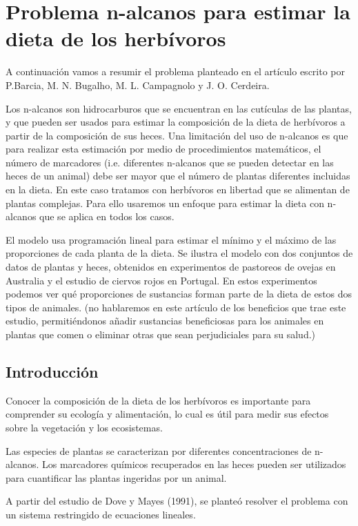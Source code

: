 \documentclass[11pt]{article}
\begin{document}
\section*{ \textbf{Problema n-alcanos para estimar la dieta de los herbívoros} } %
A continuación vamos a resumir el problema planteado en el artículo \cite{n-alkanes_problem} escrito por P.Barcia, M. N. Bugalho, M. L. Campagnolo y J. O. Cerdeira. 

Los n-alcanos son hidrocarburos que se encuentran en las cutículas de las plantas, y que pueden ser usados para estimar la composición de la dieta de herbívoros a partir de la composición de sus heces. Una limitación del uso de n-alcanos es que para realizar esta estimación por medio de procedimientos matemáticos, el número de marcadores (i.e. diferentes n-alcanos que se pueden detectar en las heces de un animal) debe ser mayor que el número de plantas diferentes incluidas en la dieta. En este caso tratamos con herbívoros en libertad que se alimentan de plantas complejas. Para ello usaremos un enfoque para estimar la dieta con n-alcanos que se aplica en todos los casos.

El modelo usa programación lineal para estimar el mínimo y el máximo de las proporciones de cada planta de la dieta. Se ilustra el modelo con dos conjuntos de datos de plantas y heces, obtenidos en experimentos de pastoreos de ovejas en Australia y el estudio de ciervos rojos en Portugal. En estos experimentos podemos ver qué proporciones de sustancias forman parte de la dieta de estos dos tipos de animales. (no hablaremos en este artículo de los beneficios que trae este estudio, permitiéndonos añadir sustancias beneficiosas para los animales en plantas que comen o eliminar otras que sean perjudiciales para su salud.)

\subsection{Introducción}

Conocer la composición de la dieta de los herbívoros es importante para comprender su ecología y alimentación, lo cual es útil para medir sus efectos sobre la vegetación y los ecosistemas.

Las especies de plantas se caracterizan por diferentes concentraciones de n-alcanos. Los marcadores químicos recuperados en las heces pueden ser utilizados para cuantificar las plantas ingeridas por un animal.

A partir del estudio de Dove y Mayes (1991), se planteó resolver el problema con un sistema restringido de ecuaciones lineales. 
\end{document}
